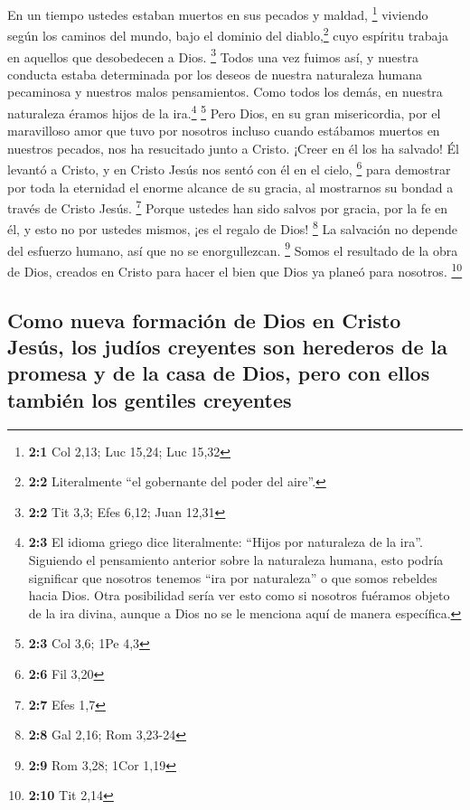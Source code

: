  En un tiempo ustedes estaban muertos en sus pecados y
maldad, \footnote{\textbf{2:1} Col 2,13; Luc 15,24; Luc 15,32}
 viviendo según los caminos del mundo, bajo el dominio del
diablo,\footnote{\textbf{2:2} Literalmente ``el gobernante del poder del
  aire''.} cuyo espíritu trabaja en aquellos que desobedecen a Dios.
\footnote{\textbf{2:2} Tit 3,3; Efes 6,12; Juan 12,31} 
Todos una vez fuimos así, y nuestra conducta estaba determinada por los
deseos de nuestra naturaleza humana pecaminosa y nuestros malos
pensamientos. Como todos los demás, en nuestra naturaleza éramos hijos
de la ira.\footnote{\textbf{2:3} El idioma griego dice literalmente:
  ``Hijos por naturaleza de la ira''. Siguiendo el pensamiento anterior
  sobre la naturaleza humana, esto podría significar que nosotros
  tenemos ``ira por naturaleza'' o que somos rebeldes hacia Dios. Otra
  posibilidad sería ver esto como si nosotros fuéramos objeto de la ira
  divina, aunque a Dios no se le menciona aquí de manera específica.}
\footnote{\textbf{2:3} Col 3,6; 1Pe 4,3}  Pero Dios, en su
gran misericordia, por el maravilloso amor que tuvo por nosotros
 incluso cuando estábamos muertos en nuestros pecados, nos
ha resucitado junto a Cristo. ¡Creer en él los ha salvado!
 Él levantó a Cristo, y en Cristo Jesús nos sentó con él
en el cielo, \footnote{\textbf{2:6} Fil 3,20}  para
demostrar por toda la eternidad el enorme alcance de su gracia, al
mostrarnos su bondad a través de Cristo Jesús. \footnote{\textbf{2:7}
  Efes 1,7}  Porque ustedes han sido salvos por gracia,
por la fe en él, y esto no por ustedes mismos, ¡es el regalo de Dios!
\footnote{\textbf{2:8} Gal 2,16; Rom 3,23-24}  La
salvación no depende del esfuerzo humano, así que no se enorgullezcan.
\footnote{\textbf{2:9} Rom 3,28; 1Cor 1,19}  Somos el
resultado de la obra de Dios, creados en Cristo para hacer el bien que
Dios ya planeó para nosotros. \footnote{\textbf{2:10} Tit 2,14}

\hypertarget{como-nueva-formaciuxf3n-de-dios-en-cristo-jesuxfas-los-juduxedos-creyentes-son-herederos-de-la-promesa-y-de-la-casa-de-dios-pero-con-ellos-tambiuxe9n-los-gentiles-creyentes}{%
\subsection{Como nueva formación de Dios en Cristo Jesús, los judíos
creyentes son herederos de la promesa y de la casa de Dios, pero con
ellos también los gentiles
creyentes}\label{como-nueva-formaciuxf3n-de-dios-en-cristo-jesuxfas-los-juduxedos-creyentes-son-herederos-de-la-promesa-y-de-la-casa-de-dios-pero-con-ellos-tambiuxe9n-los-gentiles-creyentes}}


